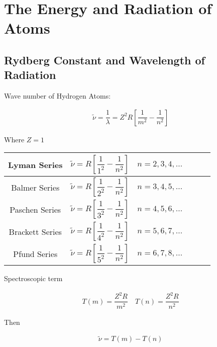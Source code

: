 \chapter{The Energy and Radiation of Atoms}

\section{Rydberg Constant and Wavelength of Radiation}

Wave number of Hydrogen Atoms:

\begin{equation}
  \begin{aligned}
    \tilde{\nu} = \dfrac{1}{\lambda} = Z^2 R \left[ \dfrac{1}{m^2} - \dfrac{1}{n^2}   \right] 
  \end{aligned}
\end{equation}

Where $Z = 1$

\begin{table*}[h]
  \centering
  \begin{tabular}{|Sc|Sc|Sc|}
    \hline
    Lyman Series & $\tilde{\nu} = R \left[ \dfrac{1}{1^2} - \dfrac{1}{n^2}   \right]$ & $n=2,3,4,\dots$ \\
    \hline
    Balmer Series & $\tilde{\nu} = R \left[ \dfrac{1}{2^2} - \dfrac{1}{n^2}   \right]$ & $n=3,4,5,\dots$ \\
    \hline
    Paschen Series & $\tilde{\nu} = R \left[ \dfrac{1}{3^2} - \dfrac{1}{n^2}   \right]$ & $n=4,5,6,\dots$ \\
    \hline
    Brackett Series & $\tilde{\nu} = R \left[ \dfrac{1}{4^2} - \dfrac{1}{n^2}   \right]$ & $n=5,6,7,\dots$ \\
    \hline
    Pfund Series & $\tilde{\nu} = R \left[ \dfrac{1}{5^2} - \dfrac{1}{n^2}   \right]$ & $n=6,7,8,\dots$ \\
    \hline
  \end{tabular}
\end{table*}

Spectroscopic term

\begin{equation*}
  \begin{aligned}
    T(m) = \dfrac{Z^2 R}{m^2} \quad
    T(n) = \dfrac{Z^2 R}{n^2}  
  \end{aligned}
\end{equation*}

Then

\begin{equation}
  \begin{aligned}
    \tilde{\nu} = T \left( m \right) - T \left( n \right)   
  \end{aligned}
\end{equation}

